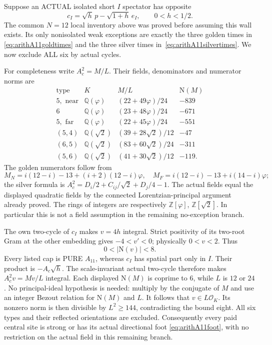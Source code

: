 \documentclass[11pt]{article}
\begin{document}
Suppose an ACTUAL isolated short \(I\) spectator
has opposite
\[
 c_I=\sqrt h\,p-\sqrt{1+h}\,e_I,\qquad 0<h<1/2 .
\]
The common \(N=12\) local inventory above
was proved before assuming this wall exists.
Its only nonisolated weak exceptions are
exactly the three golden times in
\eqref{eq:arithA11goldtimes} and the three
silver times in~\eqref{eq:arithA11silvertimes}.
We now exclude ALL six by actual cycles.

For completeness write \(A_c^2=M/L\).
Their fields, denominators and numerator
norms are
\[
 \begin{array}{c|c|c|r}
 \text{type}&K&M/L&\mathrm N(M)\\ \hline
 5,\text{ near}&\mathbb Q(\varphi)&(22+49\varphi)/24&-839\\
 6&\mathbb Q(\varphi)&(23+48\varphi)/24&-671\\
 5,\text{ far}&\mathbb Q(\varphi)&(22+45\varphi)/24&-551\\
 (5,4)&\mathbb Q(\sqrt2)&(39+28\sqrt2)/12&-47\\
 (6,5)&\mathbb Q(\sqrt2)&(83+60\sqrt2)/24&-311\\
 (5,6)&\mathbb Q(\sqrt2)&(41+30\sqrt2)/12&-119 .
 \end{array}
\]
The golden numerators follow from
\[
 M_N=i(12-i)-13+(i+2)(12-i)\varphi,\quad
 M_F=i(12-i)-13+i(14-i)\varphi;
\]
the silver formula is
\(A_c^2=D_i/2+C_{ij}/\sqrt2+D_j/4-1\).
The actual fields equal the displayed quadratic
fields by the connected Lorentzian-principal
argument already proved.
The rings of integers are respectively
\(\mathbb Z[\varphi]\), \(\mathbb Z[\sqrt2]\).
In particular this is not a field assumption
in the remaining no-exception branch.

The own two-cycle of \(c_I\) makes
\(v=4h\) integral.
Strict positivity of its two-root Gram at the
other embedding gives \(-4<v'<0\);
physically \(0<v<2\).
Thus
\[
                        0<|\mathrm N(v)|<8 .
\]
Every listed cap is PURE \(A_{11}\), whereas
\(c_I\) has spatial part only in \(I\).
Their product is \(-A_c\sqrt h\).
The scale-invariant actual two-cycle therefore
makes \(A_c^2v=Mv/L\) integral.
Each displayed \(\mathrm N(M)\) is coprime
to \(6\), while \(L\) is \(12\) or \(24\).
No principal-ideal hypothesis is needed:
multiply by the conjugate of \(M\) and use
an integer Bezout relation for
\(\mathrm N(M)\) and \(L\).
It follows that \(v\in L\mathcal O_K\).
Its nonzero norm is then divisible by
\(L^2\ge144\), contradicting the bound eight.
All six types and their reflected orientations
are excluded.
Consequently every paid central site is
strong or has its actual directional foot
\eqref{eq:arithA11foot}, with no restriction
on the actual field in this remaining branch.
\end{document}
